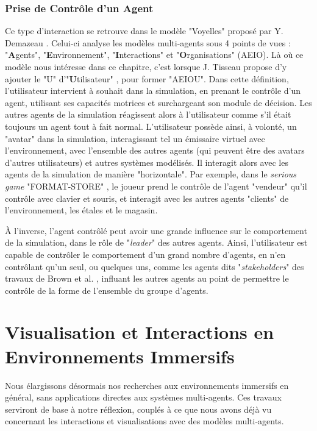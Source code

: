 	\subsubsection{Prise de Contrôle d'un Agent}
		Ce type d'interaction se retrouve dans le modèle "Voyelles" proposé par Y. Demazeau \cite{demazeau_interactions_1995}. Celui-ci analyse les modèles multi-agents sous 4 points de vues : "\textbf{A}gents", "\textbf{E}nvironnement", "\textbf{I}nteractions" et "\textbf{O}rganisations" (AEIO). Là où ce modèle nous intéresse dans ce chapitre, c'est lorsque J. Tisseau propose d'y ajouter le "U" d'"\textbf{U}tilisateur" \cite{tisseau_realite_2001}, pour former "AEIOU". Dans cette définition, l'utilisateur intervient à souhait dans la simulation, en prenant le contrôle d'un agent, utilisant ses capacités motrices et surchargeant son module de décision. Les autres agents de la simulation réagissent alors à l'utilisateur comme s'il était toujours un agent tout à fait normal. 
		L'utilisateur possède ainsi, à volonté, un "avatar" dans la simulation, interagissant tel un émissaire virtuel avec l'environnement, avec l'ensemble des autres agents (qui peuvent être des avatars d'autres utilisateurs) et autres systèmes modélisés. Il interagit alors avec les agents de la simulation de manière "horizontale". Par exemple, dans le \textit{serious game} "FORMAT-STORE" \cite{mathieu_serious_2011}, le joueur prend le contrôle de l'agent "vendeur" qu'il contrôle avec clavier et souris, et interagit avec les autres agents "clients" de l'environnement, les étales et le magasin.
		
		À l'inverse, l'agent contrôlé peut avoir une grande influence sur le comportement de la simulation, dans le rôle de "\textit{leader}" des autres agents. Ainsi, l'utilisateur est capable de contrôler le comportement d'un grand nombre d'agents, en n'en contrôlant qu'un seul, ou quelques uns, comme les agents dits "\textit{stakeholders}" des travaux de Brown et al. \cite{brown_human-swarm_2014}, influant les autres agents au point de permettre le contrôle de la forme de l'ensemble du groupe d'agents.
	
	
	\section{Visualisation et Interactions en Environnements Immersifs}	
	
	Nous élargissons désormais nos recherches aux environnements immersifs en général, sans applications directes aux systèmes multi-agents. Ces travaux serviront de base à notre réflexion, couplés à ce que nous avons déjà vu concernant les interactions et visualisations avec des modèles multi-agents.
	
